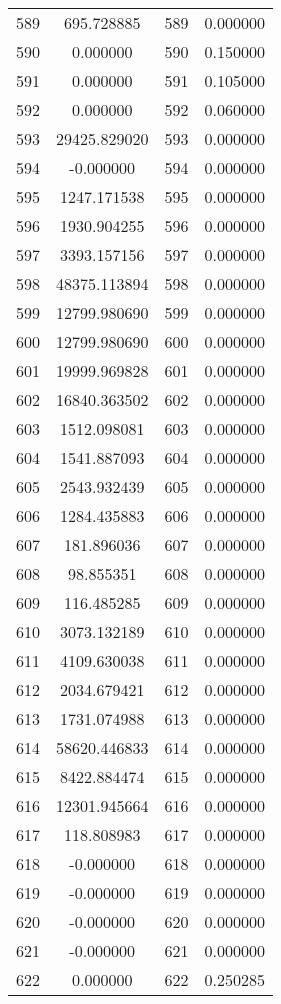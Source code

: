 \documentclass[12pt]{article}
\begin{document}
\begin{longtable}{@{}cccc@{}}
589 & 695.728885 & 589 & 0.000000 \\
590 & 0.000000 & 590 & 0.150000 \\
591 & 0.000000 & 591 & 0.105000 \\
592 & 0.000000 & 592 & 0.060000 \\
593 & 29425.829020 & 593 & 0.000000 \\
594 & -0.000000 & 594 & 0.000000 \\
595 & 1247.171538 & 595 & 0.000000 \\
596 & 1930.904255 & 596 & 0.000000 \\
597 & 3393.157156 & 597 & 0.000000 \\
598 & 48375.113894 & 598 & 0.000000 \\
599 & 12799.980690 & 599 & 0.000000 \\
600 & 12799.980690 & 600 & 0.000000 \\
601 & 19999.969828 & 601 & 0.000000 \\
602 & 16840.363502 & 602 & 0.000000 \\
603 & 1512.098081 & 603 & 0.000000 \\
604 & 1541.887093 & 604 & 0.000000 \\
605 & 2543.932439 & 605 & 0.000000 \\
606 & 1284.435883 & 606 & 0.000000 \\
607 & 181.896036 & 607 & 0.000000 \\
608 & 98.855351 & 608 & 0.000000 \\
609 & 116.485285 & 609 & 0.000000 \\
610 & 3073.132189 & 610 & 0.000000 \\
611 & 4109.630038 & 611 & 0.000000 \\
612 & 2034.679421 & 612 & 0.000000 \\
613 & 1731.074988 & 613 & 0.000000 \\
614 & 58620.446833 & 614 & 0.000000 \\
615 & 8422.884474 & 615 & 0.000000 \\
616 & 12301.945664 & 616 & 0.000000 \\
617 & 118.808983 & 617 & 0.000000 \\
618 & -0.000000 & 618 & 0.000000 \\
619 & -0.000000 & 619 & 0.000000 \\
620 & -0.000000 & 620 & 0.000000 \\
621 & -0.000000 & 621 & 0.000000 \\
622 & 0.000000 & 622 & 0.250285 \\

\end{longtable}
\end{document}
